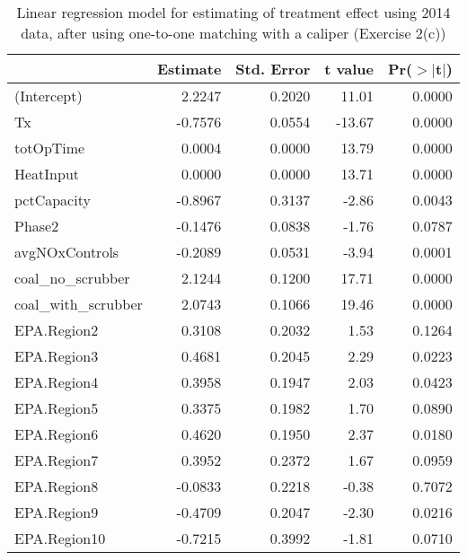 \begin{table}[ht]
\centering
\begin{tabular}{lrrrr}
  \toprule
 & Estimate & Std. Error & t value & Pr($>$$|$t$|$) \\ 
  \midrule
(Intercept) & 2.2247 & 0.2020 & 11.01 & 0.0000 \\ 
  Tx & -0.7576 & 0.0554 & -13.67 & 0.0000 \\ 
  totOpTime & 0.0004 & 0.0000 & 13.79 & 0.0000 \\ 
  HeatInput & 0.0000 & 0.0000 & 13.71 & 0.0000 \\ 
  pctCapacity & -0.8967 & 0.3137 & -2.86 & 0.0043 \\ 
  Phase2 & -0.1476 & 0.0838 & -1.76 & 0.0787 \\ 
  avgNOxControls & -0.2089 & 0.0531 & -3.94 & 0.0001 \\ 
  coal\_no\_scrubber & 2.1244 & 0.1200 & 17.71 & 0.0000 \\ 
  coal\_with\_scrubber & 2.0743 & 0.1066 & 19.46 & 0.0000 \\ 
  EPA.Region2 & 0.3108 & 0.2032 & 1.53 & 0.1264 \\ 
  EPA.Region3 & 0.4681 & 0.2045 & 2.29 & 0.0223 \\ 
  EPA.Region4 & 0.3958 & 0.1947 & 2.03 & 0.0423 \\ 
  EPA.Region5 & 0.3375 & 0.1982 & 1.70 & 0.0890 \\ 
  EPA.Region6 & 0.4620 & 0.1950 & 2.37 & 0.0180 \\ 
  EPA.Region7 & 0.3952 & 0.2372 & 1.67 & 0.0959 \\ 
  EPA.Region8 & -0.0833 & 0.2218 & -0.38 & 0.7072 \\ 
  EPA.Region9 & -0.4709 & 0.2047 & -2.30 & 0.0216 \\ 
  EPA.Region10 & -0.7215 & 0.3992 & -1.81 & 0.0710 \\ 
   \bottomrule
\end{tabular}
\caption{Linear regression model for estimating of treatment effect using 2014 data, after using one-to-one matching with a caliper (Exercise 2(c))} 
\label{tab:lm-2c-14}
\end{table}


